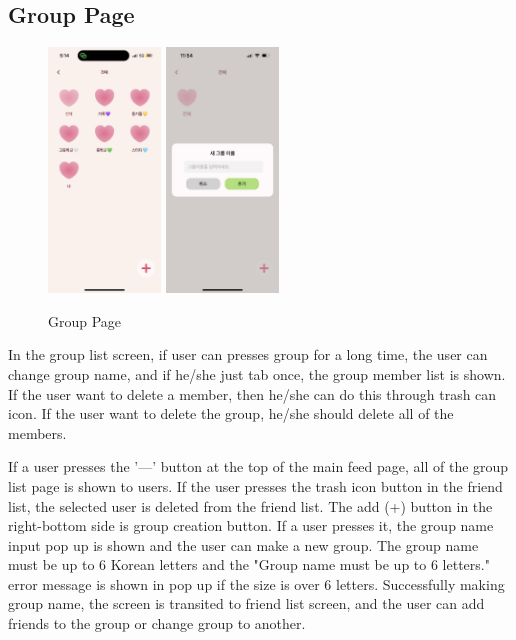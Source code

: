 \documentclass[conference]{IEEEtran}
\begin{document}
     \subsection{Group Page}
        \begin{figure}[htbp]
            \centerline{
            \includegraphics[width=3cm]{Images/page/group.png}
            \includegraphics[width=3cm]{Images/page/addGroup.jpg}}
             \caption{Group Page}
            \label{fig}
        \end{figure}
        In the group list screen, if user can presses group for a long time, the user can change group name, and if he/she just tab once, the group member list is shown. If the user want to delete a member, then he/she can do this through trash can icon. If the user want to delete the group, he/she should delete all of the members.

        If a user presses the '—' button at the top of the main feed page, all of the group list page is shown to users. If the user presses the trash icon button in the friend list, the selected user is deleted from the friend list. The add (+) button in the right-bottom side is group creation button. If a user presses it, the group name input pop up is shown and the user can make a new group. The group name must be up to 6 Korean letters and the "Group name must be up to 6 letters." error message is shown in pop up if the size is over 6 letters. Successfully making group name, the screen is transited to friend list screen, and the user can add friends to the group or change group to another.
\end{document}
